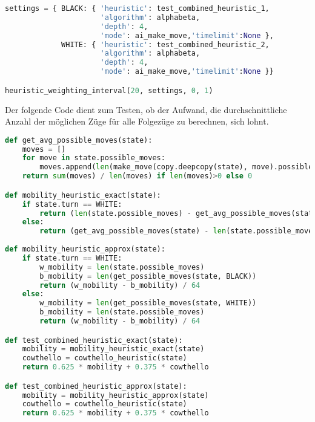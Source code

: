 \begin{lstlisting}[language=Python]
settings = { BLACK: { 'heuristic': test_combined_heuristic_1,
                      'algorithm': alphabeta,
                      'depth': 4,
                      'mode': ai_make_move,'timelimit':None },
             WHITE: { 'heuristic': test_combined_heuristic_2,
                      'algorithm': alphabeta,
                      'depth': 4,
                      'mode': ai_make_move,'timelimit':None }}

heuristic_weighting_interval(20, settings, 0, 1)
\end{lstlisting}

Der folgende Code dient zum Testen, ob der Aufwand, die
durchschnittliche Anzahl der möglichen Züge für alle Folgezüge zu
berechnen, sich lohnt.

\begin{lstlisting}[language=Python]
def get_avg_possible_moves(state):
    moves = []
    for move in state.possible_moves:
        moves.append(len(make_move(copy.deepcopy(state), move).possible_moves))
    return sum(moves) / len(moves) if len(moves)>0 else 0

def mobility_heuristic_exact(state):
    if state.turn == WHITE:
        return (len(state.possible_moves) - get_avg_possible_moves(state)) / 64
    else:
        return (get_avg_possible_moves(state) - len(state.possible_moves)) / 64
    
def mobility_heuristic_approx(state):
    if state.turn == WHITE:
        w_mobility = len(state.possible_moves)
        b_mobility = len(get_possible_moves(state, BLACK))
        return (w_mobility - b_mobility) / 64
    else:
        w_mobility = len(get_possible_moves(state, WHITE))
        b_mobility = len(state.possible_moves)
        return (w_mobility - b_mobility) / 64

def test_combined_heuristic_exact(state):
    mobility = mobility_heuristic_exact(state)
    cowthello = cowthello_heuristic(state)
    return 0.625 * mobility + 0.375 * cowthello

def test_combined_heuristic_approx(state):
    mobility = mobility_heuristic_approx(state)
    cowthello = cowthello_heuristic(state)
    return 0.625 * mobility + 0.375 * cowthello
\end{lstlisting}

